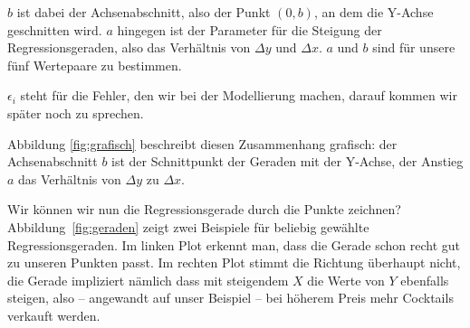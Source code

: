 \documentclass[ngerman, 12pt]{scrartcl}
\begin{document}
\(b\) ist dabei der Achsenabschnitt, also der Punkt \((0,b)\), an dem die Y-Achse geschnitten wird. $a$ hingegen ist der Parameter für die Steigung der Regressionsgeraden, also das Verhältnis von $\Delta y$ und $\Delta x$. $a$ und $b$ sind für unsere fünf Wertepaare zu bestimmen. 

\(\epsilon_i\) steht für die Fehler, den wir bei der Modellierung machen, darauf kommen wir später noch zu sprechen. 

Abbildung \ref{fig:grafisch} beschreibt diesen Zusammenhang grafisch: der Achsenabschnitt $b$ ist der Schnittpunkt der Geraden mit der Y-Achse, der Anstieg $a$ das Verhältnis von \(\Delta y\) zu \(\Delta x\).

Wir können wir nun die Regressionsgerade durch die Punkte zeichnen? Abbildung~\ref{fig:geraden} zeigt zwei Beispiele für beliebig gewählte Regressionsgeraden. Im linken Plot erkennt man, dass die Gerade schon recht gut zu unseren Punkten passt. Im rechten Plot stimmt die Richtung überhaupt nicht, die Gerade impliziert nämlich dass mit steigendem $X$ die Werte von $Y$ ebenfalls steigen, also -- angewandt auf unser Beispiel -- bei höherem Preis mehr Cocktails verkauft werden.
\end{document}
